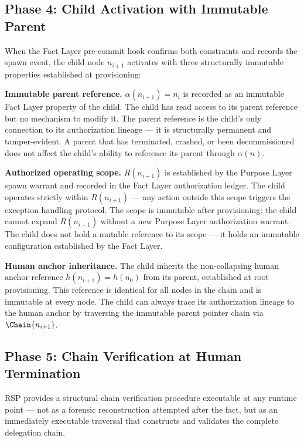 \subsection{Phase 4: Child Activation with Immutable Parent}
\label{sec:rs-phase4}

When the Fact Layer pre-commit hook confirms both constraints and records the spawn event, the child node $n_{i+1}$ activates with three structurally immutable properties established at provisioning:

\medskip
\noindent\textbf{Immutable parent reference.} $\alpha(n_{i+1}) = n_i$ is recorded as an immutable Fact Layer property of the child. The child has read access to its parent reference but no mechanism to modify it. The parent reference is the child's only connection to its authorization lineage — it is structurally permanent and tamper-evident. A parent that has terminated, crashed, or been decommissioned does not affect the child's ability to reference its parent through $\alpha(n)$.

\medskip
\noindent\textbf{Authorized operating scope.} $R(n_{i+1})$ is established by the Purpose Layer spawn warrant and recorded in the Fact Layer authorization ledger. The child operates strictly within $R(n_{i+1})$ — any action outside this scope triggers the exception handling protocol. The scope is immutable after provisioning: the child cannot expand $R(n_{i+1})$ without a new Purpose Layer authorization warrant. The child does not hold a mutable reference to its scope — it holds an immutable configuration established by the Fact Layer.

\medskip
\noindent\textbf{Human anchor inheritance.} The child inherits the non-collapsing human anchor reference $h(n_{i+1}) = h(n_0)$ from its parent, established at root provisioning. This reference is identical for all nodes in the chain and is immutable at every node. The child can always trace its authorization lineage to the human anchor by traversing the immutable parent pointer chain via $\Chain{n_{i+1}}$.

\subsection{Phase 5: Chain Verification at Human Termination}
\label{sec:rs-phase5}

RSP provides a structural chain verification procedure executable at any runtime point — not as a forensic reconstruction attempted after the fact, but as an immediately executable traversal that constructs and validates the complete delegation chain.

